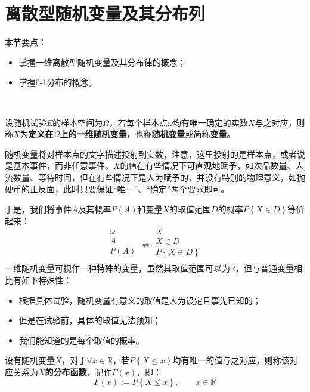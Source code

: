 \section{离散型随机变量及其分布列}

本节要点：
\begin{itemize}
    \item 掌握一维离散型随机变量及其分布律的概念；
    \item 掌握0-1分布的概念。
\end{itemize}

~

\begin{definition}[一维随机变量]
设随机试验$E$的样本空间为$\varOmega $，若每个样本点$\omega$均有唯一确定的实数$X$与之对应，则称$X$为{\bf 定义在$\varOmega $上的一维随机变量}，也称{\bf 随机变量}或简称{\bf 变量}。
\end{definition}

随机变量将对样本点的文字描述投射到实数，注意，这里投射的是样本点，或者说是基本事件，而非任意事件。$X$的值在有些情况下可直观地赋予，如次品数量、人流数量、等待时间，但在有些情况下是人为赋予的，并没有特别的物理意义，如抛硬币的正反面，此时只要保证“唯一”、“确定”两个要求即可。

于是，我们将事件$A$及其概率$P\left( A \right) $和变量$X$的取值范围$D$的概率$P\left\{ X\in D \right\} $等价起来：
\[
\begin{array}{l}
	\omega\\
	A\\
	P\left( A \right)\\
\end{array}\Leftrightarrow \begin{array}{l}
	X\\
	X\in D\\
	P\left\{ X\in D \right\}\\
\end{array}
\]
一维随机变量可视作一种特殊的变量，虽然其取值范围可以为$\mathbb{R} $，但与普通变量相比有如下特殊性：
\begin{itemize}
    \item 根据具体试验，随机变量有意义的取值是人为设定且事先已知的；
    \item 但是在试验前，具体的取值无法预知；
    \item 我们能知道的是每个取值的概率。
\end{itemize}

\begin{definition}[分布函数]
设有随机变量$X$，对于$\forall x\in \mathbb{R} $，若$P\left\{ X\leqslant x \right\} $均有唯一的值与之对应，则称该对应关系为{\bf $X$的分布函数}，记作$F\left( x \right) $，即：
\[
F\left( x \right) := P\left\{ X\leqslant x \right\} ,\qquad x\in \mathbb{R}
\]
\end{definition}


